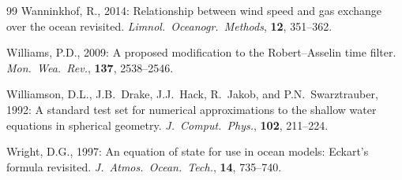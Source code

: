 \documentclass[11pt,twoside]{report}
\begin{document}
\begin{thebibliography}{99}
Wanninkhof, R., 2014:
Relationship between wind speed and gas exchange over the ocean revisited.
\textit{Limnol.\ Oceanogr.\ Methods}, \textbf{12}, 351--362.

Williams, P.D., 2009:
A proposed modification to the Robert--Asselin time filter.
\textit{Mon.\ Wea.\ Rev.}, \textbf{137}, 2538--2546.

Williamson, D.L., J.B.~Drake, J.J.~Hack, R.~Jakob, and P.N.~Swarztrauber, 1992:
A standard test set for numerical approximations to the shallow water
equations in spherical geometry.
\textit{J.\ Comput.\ Phys.}, \textbf{102}, 211--224.

Wright, D.G., 1997:
An equation of state for use in ocean models: Eckart's formula revisited.
\textit{J.\ Atmos.\ Ocean.\ Tech.}, \textbf{14}, 735--740.

\end{thebibliography}
\end{document}

